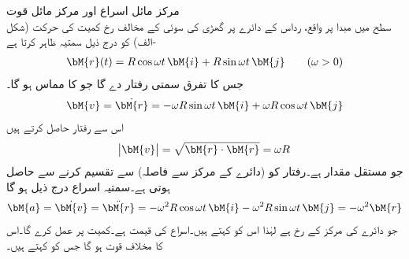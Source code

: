 \quad مرکز مائل اسراع اور مرکز مائل قوت\\
 سطح میں مبدا پر واقع، رداس  کے دائرے  پر گھڑی کی سوئی کے مخالف رخ کمیت  کی حرکت (شکل -الف)  کو درج ذیل سمتیہ ظاہر کرتا ہے
\begin{align*}
\bM{r}(t)=R\cos \omega t\,\bM{i}+R\sin \omega t\,\bM{j}\quad \quad (\omega >0)
\end{align*}
جس کا تفرق سمتی رفتار دے گا جو  کا مماس ہو گا۔
\begin{align*}
\bM{v}=\dot{\bM{r}}=-\omega R\sin \omega t\,\bM{i}+\omega R\cos \omega t \,\bM{j}
\end{align*}
اس سے رفتار حاصل کرتے ہیں 
\begin{align*}
\abs{\bM{v}}=\sqrt{\bM{r}\cdot \bM{r}}=\omega R
\end{align*}
جو مستقل  مقدار ہے۔رفتار کو (دائرے کے مرکز سے فاصلہ)  سے تقسیم کرنے سے   حاصل ہوتی ہے۔سمتیہ اسراع درج ذیل ہو گا
\begin{align*}
\bM{a}=\dot{\bM{v}}=\ddot{\bM{r}}=-\omega^2R\cos \omega t\,\bM{i}-\omega^2R\sin \omega t\,\bM{j}=-\omega^2\bM{r}
\end{align*}
جو دائرے کی مرکز کے رخ ہے لہٰذا اس کو  کہتے ہیں۔اسراع کی قیمت  ہے۔کمیت  پر   عمل کرے گا۔اس کا مخلاف قوت  ہو گا جس کو  کہتے ہیں۔
